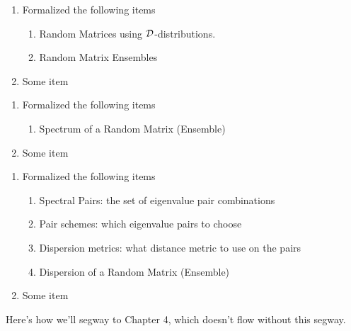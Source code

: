 \begin{enumerate}
  \item Formalized the following items
    \begin{enumerate}
      \item Random Matrices using $\mathcal{D}$-distributions.
      \item Random Matrix Ensembles
    \end{enumerate}
  \item Some item
\end{enumerate}


\begin{enumerate}
    \item Formalized the following items
      \begin{enumerate}
        \item Spectrum of a Random Matrix (Ensemble)
      \end{enumerate}
    \item Some item
\end{enumerate}


\begin{enumerate}
    \item Formalized the following items
      \begin{enumerate}
        \item Spectral Pairs: the set of eigenvalue pair combinations
        \item Pair schemes: which eigenvalue pairs to choose
        \item Dispersion metrics: what distance metric to use on the pairs
        \item Dispersion of a Random Matrix (Ensemble)
      \end{enumerate}
    \item Some item
\end{enumerate}


Here's how we'll segway to Chapter 4, which doesn't flow without this segway.

